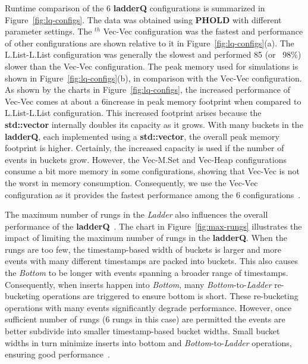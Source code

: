 Runtime comparison of the 6 \textbf{ladderQ} configurations is summarized in Figure~\ref{fig:lq-configs}. The data was obtained using \textbf{PHOLD} with different parameter settings. The $^{th}$ Vec-Vec configuration was the fastest and performance of other configurations are shown relative to it in Figure~\ref{fig:lq-configs}(a). The L.List-L.List configuration was generally the slowest and performed 85 \texttimes (or ~98\%) slower than the Vec-Vec configuration. The peak memory used for simulations is shown in Figure~\ref{fig:lq-configs}(b), in comparison with the Vec-Vec configuration.  As shown by the charts in Figure~\ref{fig:lq-configs}, the increased performance of Vec-Vec comes at about a 6\texttimes increase in peak memory footprint when compared to L.List-L.List configuration. This increased footprint arises because the \textbf{std::vector} internally doubles its capacity as it grows. With many buckets in the \textbf{ladderQ}, each implemented using a \textbf{std::vector}, the overall peak memory footprint is higher. Certainly, the increased capacity is used if the number of events in buckets grow. However, the Vec-M.Set and Vec-Heap configurations consume a bit more memory in some configurations, showing that Vec-Vec is not the worst in memory consumption. Consequently, we use the Vec-Vec configuration as it provides the fastest performance among the 6 configurations~\cite{higiro2017multi}.

The maximum number of rungs in the \emph{Ladder} also influences the overall performance of the \textbf{ladderQ}~\cite{tang-05}. The chart in Figure~\ref{fig:max-rungs} illustrates the impact of limiting the maximum number of rungs in the \textbf{ladderQ}. When the rungs are too few, the timestamp-based width of buckets is larger and more events with many different timestamps are packed into buckets. This also
causes the \emph{Bottom} to be longer with events spanning a broader range of timestamps. Consequently, when inserts happen into \emph{Bottom}, many \emph{Bottom}-to-\emph{Ladder} re-bucketing operations are triggered to ensure bottom is short. These re-bucketing operations with many events significantly degrade
performance. However, once sufficient number of rungs (6 rungs in this case) are permitted the events are better subdivide into smaller timestamp-based bucket widths. Small bucket widths in turn minimize
inserts into bottom and \emph{Bottom}-to-\emph{Ladder} operations, ensuring good performance~\cite{higiro2017multi}.

